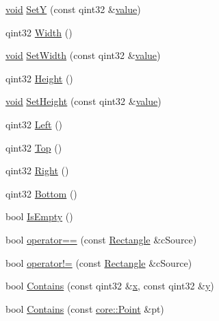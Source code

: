 \begin{DoxyCompactItemize}
\item 
\hyperlink{group___u_a_v_objects_plugin_ga444cf2ff3f0ecbe028adce838d373f5c}{void} \hyperlink{group___o_p_map_widget_gaea8a51114d79ece5fb59532867e15328}{Set\-Y} (const qint32 \&\hyperlink{glext_8h_aa0e2e9cea7f208d28acda0480144beb0}{value})
\item 
qint32 \hyperlink{group___o_p_map_widget_ga1dcf3f71849a2534fe47d2db0fb5a317}{Width} ()
\item 
\hyperlink{group___u_a_v_objects_plugin_ga444cf2ff3f0ecbe028adce838d373f5c}{void} \hyperlink{group___o_p_map_widget_gadf0be7cce382491567f5eceec5dbb0a2}{Set\-Width} (const qint32 \&\hyperlink{glext_8h_aa0e2e9cea7f208d28acda0480144beb0}{value})
\item 
qint32 \hyperlink{group___o_p_map_widget_gaef58ba0ac7584cbe21ca8e4763187ffc}{Height} ()
\item 
\hyperlink{group___u_a_v_objects_plugin_ga444cf2ff3f0ecbe028adce838d373f5c}{void} \hyperlink{group___o_p_map_widget_ga88adf48284c51b739196968be6fa880b}{Set\-Height} (const qint32 \&\hyperlink{glext_8h_aa0e2e9cea7f208d28acda0480144beb0}{value})
\item 
qint32 \hyperlink{group___o_p_map_widget_ga63b6483e8a88de2d85d97e8d97477133}{Left} ()
\item 
qint32 \hyperlink{group___o_p_map_widget_gaa6e68777faa43b088a20ae9e33b964dd}{Top} ()
\item 
qint32 \hyperlink{group___o_p_map_widget_ga3d473ded37080d218c696415f34d7141}{Right} ()
\item 
qint32 \hyperlink{group___o_p_map_widget_ga9c67095a9af32efd25d873638e82a4d6}{Bottom} ()
\item 
bool \hyperlink{group___o_p_map_widget_ga62166310290103c5ae2f9fa8f2897108}{Is\-Empty} ()
\item 
bool \hyperlink{group___o_p_map_widget_ga7035d0d861ec954d00fbfac5b0294105}{operator==} (const \hyperlink{structinternals_1_1_rectangle}{Rectangle} \&c\-Source)
\item 
bool \hyperlink{group___o_p_map_widget_ga646c7f23cab3711b80ef2a20056acdf0}{operator!=} (const \hyperlink{structinternals_1_1_rectangle}{Rectangle} \&c\-Source)
\item 
bool \hyperlink{group___o_p_map_widget_ga9a50cb554ff687d93a14da4f11d11bd1}{Contains} (const qint32 \&\hyperlink{glext_8h_a1db9d104e3c2128177f26aff7b46982f}{x}, const qint32 \&\hyperlink{glext_8h_a42315f3ed8fff752bb47fd782309fcfc}{y})
\item 
bool \hyperlink{group___o_p_map_widget_gae21b00316ef3c6fc871a429a41261624}{Contains} (const \hyperlink{structcore_1_1_point}{core\-::\-Point} \&pt)

\end{DoxyCompactItemize}
